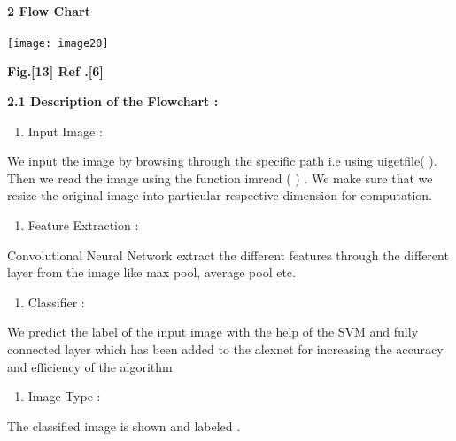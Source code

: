 \documentclass{article} %
\begin{document}
\noindent 
\paragraph{2 Flow Chart}

\noindent \texttt{[image: image20]}

\noindent \textbf{      Fig.[13] Ref .[6]}

\noindent \textbf{}

\noindent \textbf{}

\noindent \textbf{}

\noindent \textbf{}

\noindent \textbf{2.1 Description of the Flowchart :}

\begin{enumerate}
\item \textbf{ }Input Image :
\end{enumerate}

\noindent      We input the image by browsing through the specific path i.e using uigetfile( ). Then we read the image using the function imread ( ) . We make sure that we resize the original image into particular respective dimension for computation. 

\begin{enumerate}
\item  Feature Extraction :
\end{enumerate}

\noindent       Convolutional Neural Network extract the different features  through the different layer from the image like max pool, average pool etc.  

\begin{enumerate}
\item  Classifier :
\end{enumerate}

\noindent       We predict the label of the input image with the help of the SVM and fully connected layer which has been added to the alexnet for increasing the accuracy and efficiency of the algorithm 

\begin{enumerate}
\item  Image Type :
\end{enumerate}

\noindent                      The classified image is shown and labeled . 

\noindent 

\noindent 
\end{document}
